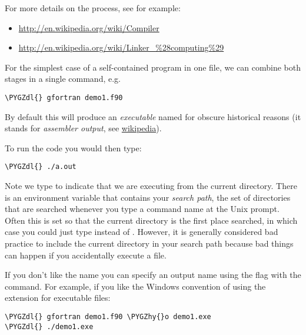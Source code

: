 \documentclass[letterpaper,10pt,english]{sphinxmanual}
\def\PYGZdl{\char`\$}
\def\PYGZhy{\char`\-}
\begin{document}
For more details on the process, see for example:
\begin{itemize}
\item {} 
\url{http://en.wikipedia.org/wiki/Compiler}

\item {} 
\url{http://en.wikipedia.org/wiki/Linker\_\%28computing\%29}

\end{itemize}

For the simplest case of a self-contained program in one file, we can
combine both stages in a single  command, e.g.

\begin{Verbatim}[commandchars=\\\{\}]
\PYGZdl{} gfortran demo1.f90
\end{Verbatim}

By default this will produce an \emph{executable} named  for
obscure historical reasons (it stands for \emph{assembler output},
see \href{http://en.wikipedia.org/wiki/A.out}{wikipedia}).

To run the code you would then type:

\begin{Verbatim}[commandchars=\\\{\}]
\PYGZdl{} ./a.out
\end{Verbatim}

Note we type  to indicate that we are executing  from
the current directory.  There is an environment variable  that
contains your \emph{search path}, the set of directories that are searched
whenever you type a command name at the Unix prompt.  Often this is
set so that the current directory is the first place searched, in
which case you could just type  instead of .
However, it is generally considered bad practice to include the
current directory in your search path because bad things can happen
if you accidentally execute a file.

If you don't like the name  you can specify an output name
using the  flag with the  command.  For example,
if you like the Windows convention of using the extension  for
executable files:

\begin{Verbatim}[commandchars=\\\{\}]
\PYGZdl{} gfortran demo1.f90 \PYGZhy{}o demo1.exe
\PYGZdl{} ./demo1.exe
\end{Verbatim}
\end{document}

